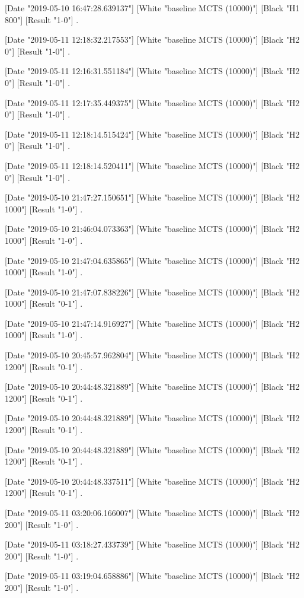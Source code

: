 {[Date "2019-05-10 16:47:28.639137"]
[White "baseline MCTS (10000)"]
[Black "H1 800"]
[Result "1-0"]
.

[Date "2019-05-11 12:18:32.217553"]
[White "baseline MCTS (10000)"]
[Black "H2 0"]
[Result "1-0"]
.

[Date "2019-05-11 12:16:31.551184"]
[White "baseline MCTS (10000)"]
[Black "H2 0"]
[Result "1-0"]
.

[Date "2019-05-11 12:17:35.449375"]
[White "baseline MCTS (10000)"]
[Black "H2 0"]
[Result "1-0"]
.

[Date "2019-05-11 12:18:14.515424"]
[White "baseline MCTS (10000)"]
[Black "H2 0"]
[Result "1-0"]
.

[Date "2019-05-11 12:18:14.520411"]
[White "baseline MCTS (10000)"]
[Black "H2 0"]
[Result "1-0"]
.

[Date "2019-05-10 21:47:27.150651"]
[White "baseline MCTS (10000)"]
[Black "H2 1000"]
[Result "1-0"]
.

[Date "2019-05-10 21:46:04.073363"]
[White "baseline MCTS (10000)"]
[Black "H2 1000"]
[Result "1-0"]
.

[Date "2019-05-10 21:47:04.635865"]
[White "baseline MCTS (10000)"]
[Black "H2 1000"]
[Result "1-0"]
.

[Date "2019-05-10 21:47:07.838226"]
[White "baseline MCTS (10000)"]
[Black "H2 1000"]
[Result "0-1"]
.

[Date "2019-05-10 21:47:14.916927"]
[White "baseline MCTS (10000)"]
[Black "H2 1000"]
[Result "1-0"]
.

[Date "2019-05-10 20:45:57.962804"]
[White "baseline MCTS (10000)"]
[Black "H2 1200"]
[Result "0-1"]
.

[Date "2019-05-10 20:44:48.321889"]
[White "baseline MCTS (10000)"]
[Black "H2 1200"]
[Result "0-1"]
.

[Date "2019-05-10 20:44:48.321889"]
[White "baseline MCTS (10000)"]
[Black "H2 1200"]
[Result "0-1"]
.

[Date "2019-05-10 20:44:48.321889"]
[White "baseline MCTS (10000)"]
[Black "H2 1200"]
[Result "0-1"]
.

[Date "2019-05-10 20:44:48.337511"]
[White "baseline MCTS (10000)"]
[Black "H2 1200"]
[Result "0-1"]
.

[Date "2019-05-11 03:20:06.166007"]
[White "baseline MCTS (10000)"]
[Black "H2 200"]
[Result "1-0"]
.

[Date "2019-05-11 03:18:27.433739"]
[White "baseline MCTS (10000)"]
[Black "H2 200"]
[Result "1-0"]
.

[Date "2019-05-11 03:19:04.658886"]
[White "baseline MCTS (10000)"]
[Black "H2 200"]
[Result "1-0"]
.

}
